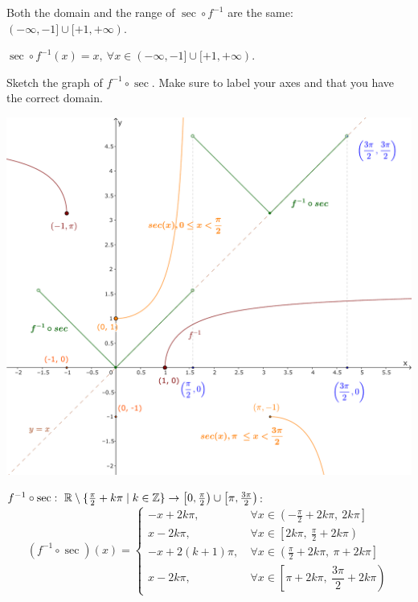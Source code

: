 \documentclass{article}
\begin{document}
\begin{soln}
    Both the domain and the range of $\sec \circ f^{-1}$ are the same: $(-\infty, -1] \cup [+1, +\infty).$

    $\sec \circ f^{-1}(x) = x,\ \forall x \in (-\infty, -1] \cup [+1, +\infty).$
\end{soln}

\newpage

\begin{problem*}[1d]
    Sketch the graph of $f^{-1} \circ \sec.$ Make sure to label your axes and that you have the correct domain.
\end{problem*}

\begin{center}
    \includegraphics[width=14cm]{./svg/pdf/derivative-2-1d-f.pdf}
\end{center}

\begin{soln}
    $f^{-1} \circ \sec:\ \mathbb R \setminus \{ \frac{\pi}{2} + k \pi \mid k \in \mathbb Z \} \rightarrow \left[0, \frac{\pi}{2} \right) \cup \left[\pi, \frac{3\pi}{2} \right)$:
    \[
        (f^{-1} \circ \sec)(x) = 
        \left\{
            \begin{aligned}
                -x + 2k\pi, &\ \forall x \in \left( -\frac{\pi}{2} + 2k\pi,\ 2k\pi \right]\\
                x - 2k\pi, &\ \forall x \in \left[ 2k\pi,\ \frac{\pi}{2} + 2k\pi \right)\\
                -x + 2(k+1)\pi, &\ \forall x \in \left( \frac{\pi}{2} + 2k\pi,\ \pi + 2k\pi \right]\\
                x - 2k\pi, &\ \forall x \in \left[ \pi + 2k\pi,\ \dfrac{3\pi}{2} + 2k\pi \right)
            \end{aligned}
        \right.
    \]
\end{soln}
\end{document}
